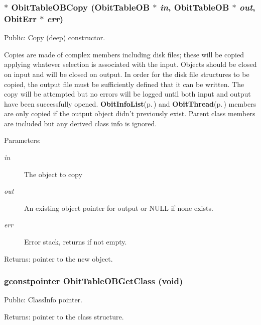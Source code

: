 \subsubsection{$\ast$ Obit\-Table\-OBCopy ({\bf Obit\-Table\-OB} $\ast$ {\em in}, {\bf Obit\-Table\-OB} $\ast$ {\em out}, {\bf Obit\-Err} $\ast$ {\em err})}\label{ObitTableOB_8c_a20}


Public: Copy (deep) constructor. 

Copies are made of complex members including disk files; these will be copied applying whatever selection is associated with the input. Objects should be closed on input and will be closed on output. In order for the disk file structures to be copied, the output file must be sufficiently defined that it can be written. The copy will be attempted but no errors will be logged until both input and output have been successfully opened. {\bf Obit\-Info\-List}{\rm (p.\,\pageref{structObitInfoList})} and {\bf Obit\-Thread}{\rm (p.\,\pageref{structObitThread})} members are only copied if the output object didn't previously exist. Parent class members are included but any derived class info is ignored. \begin{Desc}
\item[Parameters:]
\begin{description}
\item[{\em in}]The object to copy \item[{\em out}]An existing object pointer for output or NULL if none exists. \item[{\em err}]Error stack, returns if not empty. \end{description}
\end{Desc}
\begin{Desc}
\item[Returns:]pointer to the new object. \end{Desc}
\subsubsection{\setlength{\rightskip}{0pt plus 5cm}gconstpointer Obit\-Table\-OBGet\-Class (void)}\label{ObitTableOB_8c_a17}


Public: Class\-Info pointer. 

\begin{Desc}
\item[Returns:]pointer to the class structure. \end{Desc}
